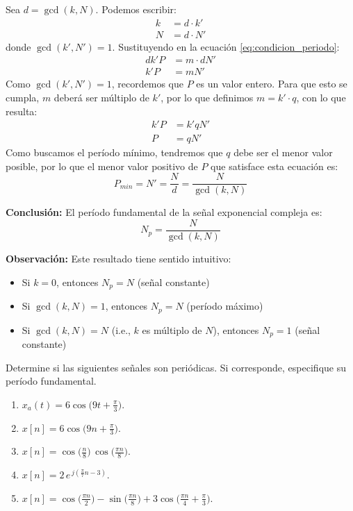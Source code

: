 \documentclass[
  11pt,
  letterpaper,
   addpoints,
   answers
  ]{exam}
\begin{document}
\begin{questions}
\begin{solution}
Sea \(d = \gcd(k,N)\). Podemos escribir:
\begin{align}
k &= d \cdot k' \\
N &= d \cdot N'
\end{align}
donde \(\gcd(k', N') = 1\). Sustituyendo en la ecuación \eqref{eq:condicion_periodo}:
\begin{align}
d k' P &= m \cdot d N' \\
k' P &= m N'
\end{align}
Como \(\gcd(k', N') = 1\), recordemos que \(P\) es un valor entero. Para que esto se cumpla, \(m\) deberá ser múltiplo de \(k'\), por lo que definimos \(m=k'\cdot q\), con lo que resulta:
\begin{align}
  k' P &= k' q N' \\
  P &= q N'
\end{align}
Como buscamos el período mínimo, tendremos que \(q\) debe ser el menor valor posible, por lo que el menor valor positivo de \(P\) que satisface esta ecuación es:
\begin{equation}
P_{min} = N' = \frac{N}{d} = \frac{N}{\gcd(k,N)}
\end{equation}

\medskip
\textbf{Conclusión:} El período fundamental de la señal exponencial compleja es:
\begin{equation}
\boxed{N_p = \frac{N}{\gcd(k,N)}}
\end{equation}

\textbf{Observación:} Este resultado tiene sentido intuitivo:
\begin{itemize}
\item Si \(k = 0\), entonces \(N_p = N\) (señal constante)
\item Si \(\gcd(k,N) = 1\), entonces \(N_p = N\) (período máximo)
\item Si \(\gcd(k,N) = N\) (i.e., \(k\) es múltiplo de \(N\)), entonces \(N_p = 1\) (señal constante)
\end{itemize}

\end{solution}

    \question Determine si las siguientes señales son periódicas. Si corresponde, especifique su período fundamental.
\begin{enumerate}
  \item \(x_a(t)=6\cos\big(9t+\tfrac{\pi}{3}\big)\).
  \item \(x[n]=6\cos\big(9n+\tfrac{\pi}{3}\big)\).
  \item \(x[n]=\cos\!\big(\tfrac{n}{8}\big)\,\cos\!\big(\tfrac{\pi n}{8}\big)\).
  \item \(x[n]=2\,e^{\,j\left(\tfrac{\pi}{7}n-3\right)}\).
  \item \(x[n]=\cos\!\big(\tfrac{\pi n}{2}\big)-\sin\!\big(\tfrac{\pi n}{8}\big)+3\cos\!\big(\tfrac{\pi n}{4}+\tfrac{\pi}{3}\big)\).
\end{enumerate}


\end{questions}
\end{document}
